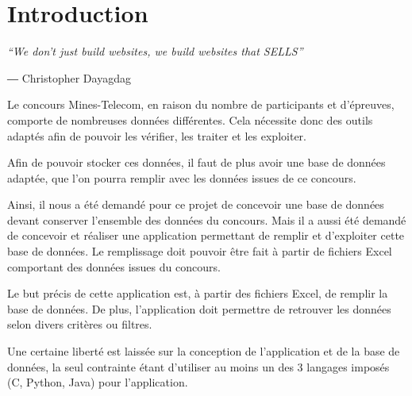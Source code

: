 \chapter*{Introduction}

\epigraph{\itshape“We don't just build websites, we build websites that SELLS”}{
― Christopher Dayagdag}
\begin{multicols}{3}
Le concours Mines-Telecom, en raison du nombre de participants et d'épreuves, comporte de nombreuses données différentes. Cela nécessite donc des outils adaptés afin de pouvoir les vérifier, les traiter et les exploiter.

Afin de pouvoir stocker ces données, il faut de plus avoir une base de données adaptée, que l'on pourra remplir avec les données issues de ce concours.

Ainsi, il nous a été demandé pour ce projet de concevoir une base de données devant conserver l'ensemble des données du concours. Mais il a aussi été demandé de concevoir et réaliser une application permettant de remplir et d'exploiter cette base de données. Le remplissage doit pouvoir être fait à partir de fichiers Excel comportant des données issues du concours.

Le but précis de cette application est, à partir des fichiers Excel, de remplir la base de données. De plus, l'application doit permettre de retrouver les données selon divers critères ou filtres.

Une certaine liberté est laissée sur la conception de l'application et de la base de données, la seul contrainte étant d'utiliser au moins un des 3 langages imposés (C, Python, Java) pour l'application.
\end{multicols}